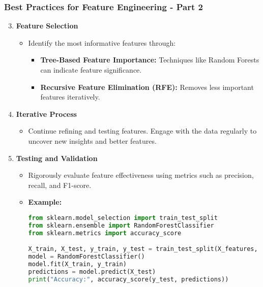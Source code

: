 \documentclass[aspectratio=169]{beamer}
\begin{document}
\begin{frame}
    \frametitle{Best Practices for Feature Engineering - Part 2}
    \begin{enumerate}
        \setcounter{enumi}{2} %
        
        \item \textbf{Feature Selection}
        \begin{itemize}
            \item Identify the most informative features through:
            \begin{itemize}
                \item \textbf{Tree-Based Feature Importance:} Techniques like Random Forests can indicate feature significance.
                \item \textbf{Recursive Feature Elimination (RFE):} Removes less important features iteratively.
            \end{itemize}
        \end{itemize}
        
        \item \textbf{Iterative Process}
        \begin{itemize}
            \item Continue refining and testing features. Engage with the data regularly to uncover new insights and better features.
        \end{itemize}
        
        \item \textbf{Testing and Validation}
        \begin{itemize}
            \item Rigorously evaluate feature effectiveness using metrics such as precision, recall, and F1-score.
            \item \textbf{Example:}
            \begin{lstlisting}[language=Python]
from sklearn.model_selection import train_test_split
from sklearn.ensemble import RandomForestClassifier
from sklearn.metrics import accuracy_score

X_train, X_test, y_train, y_test = train_test_split(X_features, y, test_size=0.2)
model = RandomForestClassifier()
model.fit(X_train, y_train)
predictions = model.predict(X_test)
print("Accuracy:", accuracy_score(y_test, predictions))
            \end{lstlisting}
        \end{itemize}
    \end{enumerate}
\end{frame}
\end{document}
